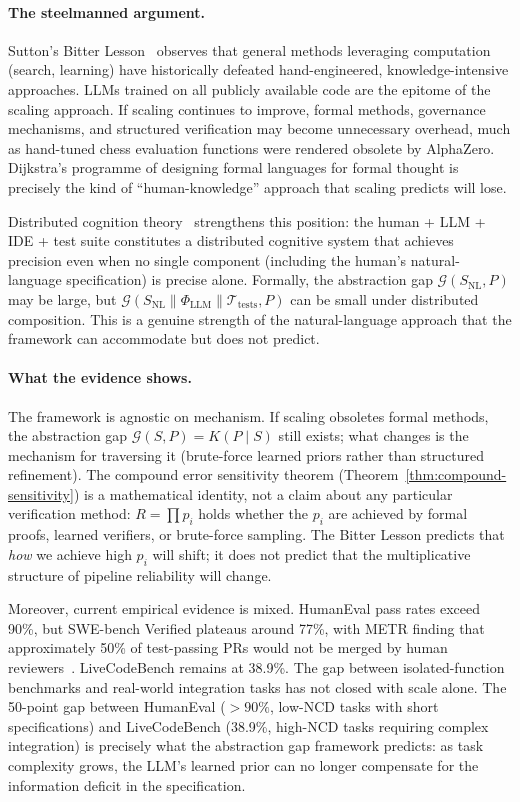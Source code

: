 \documentclass[11pt, a4paper, logo, copyright]{googledeepmind}
\begin{document}
\paragraph{The steelmanned argument.}
Sutton's Bitter Lesson~\citep{sutton2019bitter} observes that general methods
leveraging computation (search, learning) have historically defeated
hand-engineered, knowledge-intensive approaches.  LLMs trained on all publicly
available code are the epitome of the scaling approach.  If scaling continues to
improve, formal methods, governance mechanisms, and structured verification may
become unnecessary overhead, much as hand-tuned chess evaluation functions were
rendered obsolete by AlphaZero.  Dijkstra's programme of designing formal
languages for formal thought is precisely the kind of ``human-knowledge''
approach that scaling predicts will lose.

Distributed cognition theory~\citep{hutchins1995cognition, clark2003natural}
strengthens this position: the human + LLM + IDE + test suite constitutes a
distributed cognitive system that achieves precision even when no single
component (including the human's natural-language specification) is precise
alone.  Formally, the abstraction gap $\mathcal{G}(S_{\text{NL}}, P)$ may be
large, but $\mathcal{G}(S_{\text{NL}} \parallel \Phi_{\text{LLM}} \parallel
\mathcal{T}_{\text{tests}}, P)$ can be small under distributed composition.
This is a genuine strength of the natural-language approach that the framework
can accommodate but does not predict.

\paragraph{What the evidence shows.}
The framework is agnostic on mechanism.  If scaling obsoletes formal methods,
the abstraction gap $\mathcal{G}(S, P) = K(P \mid S)$ still exists; what
changes is the mechanism for traversing it (brute-force learned priors rather
than structured refinement).  The compound error sensitivity theorem
(Theorem~\ref{thm:compound-sensitivity}) is a mathematical identity, not a claim about
any particular verification method: $R = \prod p_i$ holds whether the $p_i$ are
achieved by formal proofs, learned verifiers, or brute-force sampling.  The
Bitter Lesson predicts that \emph{how} we achieve high $p_i$ will shift; it
does not predict that the multiplicative structure of pipeline reliability will
change.

Moreover, current empirical evidence is mixed.  HumanEval pass rates exceed
90\%, but SWE-bench Verified plateaus around 77\%, with METR finding that
approximately 50\% of test-passing PRs would not be merged by human
reviewers~\citep{metr2026swebench}.  LiveCodeBench remains at 38.9\%.  The gap
between isolated-function benchmarks and real-world integration tasks has not
closed with scale alone.  The 50-point gap between HumanEval ($> 90\%$, low-NCD
tasks with short specifications) and LiveCodeBench (38.9\%, high-NCD tasks
requiring complex integration) is precisely what the abstraction gap framework
predicts: as task complexity grows, the LLM's learned prior can no longer
compensate for the information deficit in the specification.
\end{document}

